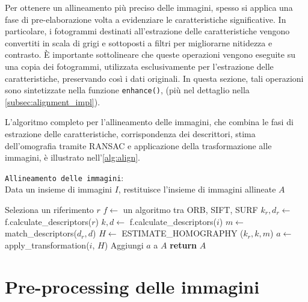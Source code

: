 Per ottenere un allineamento più preciso delle immagini, spesso si applica una fase di pre-elaborazione volta a evidenziare le caratteristiche significative. In particolare, i fotogrammi destinati all’estrazione delle caratteristiche vengono convertiti in scala di grigi e sottoposti a filtri per migliorarne nitidezza e contrasto. È importante sottolineare che queste operazioni vengono eseguite su una copia dei fotogrammi, utilizzata esclusivamente per l’estrazione delle caratteristiche, preservando così i dati originali. In questa sezione, tali operazioni sono sintetizzate nella funzione \texttt{enhance()}, (più nel dettaglio nella \cref{subsec:alignment_impl}). 

L'algoritmo completo per l'allineamento delle immagini, che combina le fasi di estrazione delle caratteristiche, corrispondenza dei descrittori, stima dell'omografia tramite RANSAC e applicazione della trasformazione alle immagini, è illustrato nell'\cref{alg:align}.

\begin{algorithm}[H] \caption{\texttt{Allineamento delle immagini}:\\ Data un insieme di immagini $I$, restituisce l'insieme di immagini allineate $A$} \label{alg:align}
    \begin{algorithmic}[1]
            \State Seleziona un riferimento $r$ 
            \State $f \gets$ un algoritmo tra ORB, SIFT, SURF
            \State $k_{r}, d_{r} \gets$ f.calculate\_descriptors($r$) 
                \State $k, d \gets$ f.calculate\_descriptors($i$) 
                \State $m \gets$ match\_descriptors($d_{r}, d$) 
                \State $H \gets$ \small ESTIMATE\_HOMOGRAPHY \normalsize ($k_{r}, k, m$) 
                \State $a \gets$ apply\_transformation($i$, $H$) 
                \State Aggiungi $a$ a $A$
            \EndFor
            \State \textbf{return} $A$
        \EndFunction
    \end{algorithmic}
\end{algorithm}

\section{Pre-processing delle immagini} \label{sec:preprocessing}

